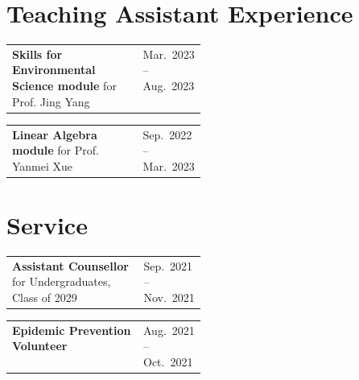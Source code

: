 \documentclass[11pt,a4paper]{article}
\makeatletter
\newcommand{\datedentry}[3][0.28]{%
  \noindent
  \begin{tabularx}{\linewidth}{@{}>{\raggedright\arraybackslash}X >{\raggedleft\arraybackslash}p{#1\linewidth}@{}}
    #2 & #3
  \end{tabularx}\par
}
\makeatother
\begin{document}
\section*{Teaching Assistant Experience}

\datedentry{\textbf{Skills for Environmental Science module} for Prof. Jing Yang}{Mar.~2023 -- Aug.~2023}
\datedentry{\textbf{Linear Algebra module} for Prof. Yanmei Xue}{Sep.~2022 -- Mar.~2023}

\section*{Service}

\datedentry{\textbf{Assistant Counsellor} for Undergraduates, Class of 2029}{Sep.~2021 -- Nov.~2021}
\datedentry{\textbf{Epidemic Prevention Volunteer}}{Aug.~2021 -- Oct.~2021}
\end{document}
